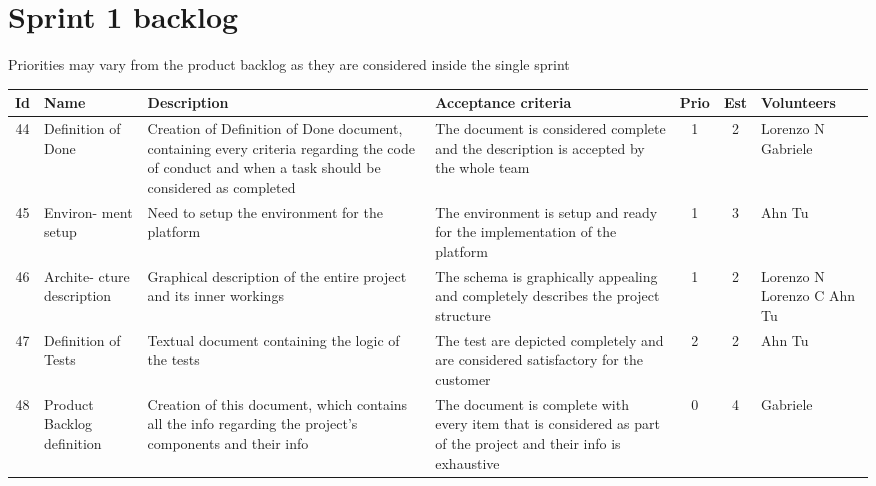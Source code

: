 \section{Sprint 1 backlog} \label{sprint1_backlog}
Priorities may vary from the product backlog as they are considered inside the single sprint \\

\begin{tabular}{|c|m{1.5cm}|m{4cm}|m{2.5cm}|c|c|m{1.8cm}|}
	\hline	     \textbf{Id}&\textbf{Name}&\textbf{Description}&\textbf{Acceptance criteria}&\textbf{Prio}&\textbf{Est}&\textbf{Volunteers}\\
	\hline
	44 & Definition of Done & 
	Creation of Definition of Done document, containing every criteria regarding the code of conduct and when a task should be considered as completed & 
	The document is considered complete and the description is accepted by the whole team &
	1 & 2 & 
	Lorenzo N Gabriele \\
	
	\hline
	45 & Environ- ment setup & 
	Need to setup the environment for the platform & 
	The environment is setup and ready for the implementation of the platform &
	1 & 3 & 
	Ahn Tu \\
	
	\hline
	46 & Archite- cture description & 
	Graphical description of the entire project and its inner workings & 
	The schema is graphically appealing and completely describes the project structure &
	1 & 2 & 
	Lorenzo N Lorenzo C Ahn Tu \\
	
	\hline
	47 & Definition of Tests & 
	Textual document containing the logic of the tests & 
	The test are depicted completely and are considered satisfactory for the customer &
	2 & 2 & 
	Ahn Tu \\
	
	\hline
	48 & Product Backlog definition & 
	Creation of this document, which contains all the info regarding the project's components and their info & 
	The document is complete with every item that is considered as part of the project and their info is exhaustive &
	0 & 4 & 
	Gabriele \\
	\hline
\end{tabular}

